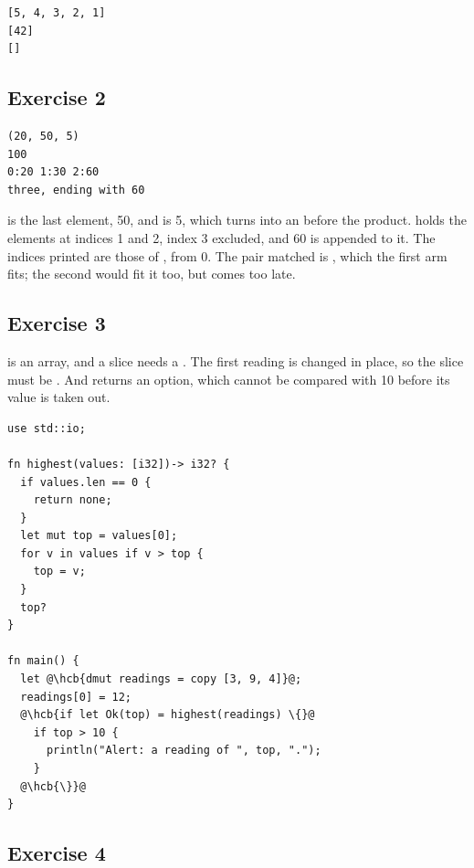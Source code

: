 
\vspace{-10pt}%
\begin{lstlisting}[style=bashVerb]
[5, 4, 3, 2, 1]
[42]
[]
\end{lstlisting}

\subsection*{Exercise 2}

\begin{lstlisting}[style=bashVerb]
(20, 50, 5)
100
0:20 1:30 2:60
three, ending with 60
\end{lstlisting}

 is the last element, 50, and  is 5, which
 turns into an  before the product. 
holds the elements at indices 1 and 2, index 3 excluded, and 60 is appended to
it. The indices printed are those of , from 0. The pair matched is
, which the first arm fits; the second would fit it too, but
comes too late.

\subsection*{Exercise 3}

\token{[3, 9, 4]} is an array, and a slice needs a . The first
reading is changed in place, so the slice must be . And
 returns an option, which cannot be compared with 10 before its
value is taken out.

\begin{lstlisting}[style=coloredverbatim, escapechar=@, caption=Solution for exercise 3]
use std::io;

fn highest(values: [i32])-> i32? {
  if values.len == 0 {
    return none;
  }
  let mut top = values[0];
  for v in values if v > top {
    top = v;
  }
  top?
}

fn main() {
  let @\hcb{dmut readings = copy [3, 9, 4]}@;
  readings[0] = 12;
  @\hcb{if let Ok(top) = highest(readings) \{}@
    if top > 10 {
      println("Alert: a reading of ", top, ".");
    }
  @\hcb{\}}@
}
\end{lstlisting}

\subsection*{Exercise 4}

